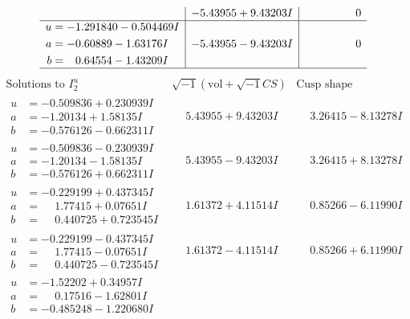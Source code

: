 \documentclass[1p]{elsarticle_modified}
\theoremstyle{definition}
\newcommand{\I}{\sqrt{-1}}
\begin{document}
$$\begin{array}{c|c|c}
 & -5.43955 + 9.43203 I & \phantom{-0.000000 } 0 \\ \hline\begin{aligned}
u &= -1.291840 - 0.504469 I \\
a &= -0.60889 - 1.63176 I \\
b &= \phantom{-}0.64554 - 1.43209 I\end{aligned}
 & -5.43955 - 9.43203 I & \phantom{-0.000000 } 0\\
 \hline 
 \end{array}$$\newpage$$\begin{array}{c|c|c}  
\text{Solutions to }I^u_{2}& \I (\text{vol} + \sqrt{-1}CS) & \text{Cusp shape}\\
 \hline 
\begin{aligned}
u &= -0.509836 + 0.230939 I \\
a &= -1.20134 + 1.58135 I \\
b &= -0.576126 - 0.662311 I\end{aligned}
 & \phantom{-}5.43955 + 9.43203 I & \phantom{-}3.26415 - 8.13278 I \\ \hline\begin{aligned}
u &= -0.509836 - 0.230939 I \\
a &= -1.20134 - 1.58135 I \\
b &= -0.576126 + 0.662311 I\end{aligned}
 & \phantom{-}5.43955 - 9.43203 I & \phantom{-}3.26415 + 8.13278 I \\ \hline\begin{aligned}
u &= -0.229199 + 0.437345 I \\
a &= \phantom{-}1.77415 + 0.07651 I \\
b &= \phantom{-}0.440725 + 0.723545 I\end{aligned}
 & \phantom{-}1.61372 + 4.11514 I & \phantom{-}0.85266 - 6.11990 I \\ \hline\begin{aligned}
u &= -0.229199 - 0.437345 I \\
a &= \phantom{-}1.77415 - 0.07651 I \\
b &= \phantom{-}0.440725 - 0.723545 I\end{aligned}
 & \phantom{-}1.61372 - 4.11514 I & \phantom{-}0.85266 + 6.11990 I \\ \hline\begin{aligned}
u &= -1.52202 + 0.34957 I \\
a &= \phantom{-}0.17516 - 1.62801 I \\
b &= -0.485248 - 1.220680 I\end{aligned}

\end{array}$$
\end{document}

